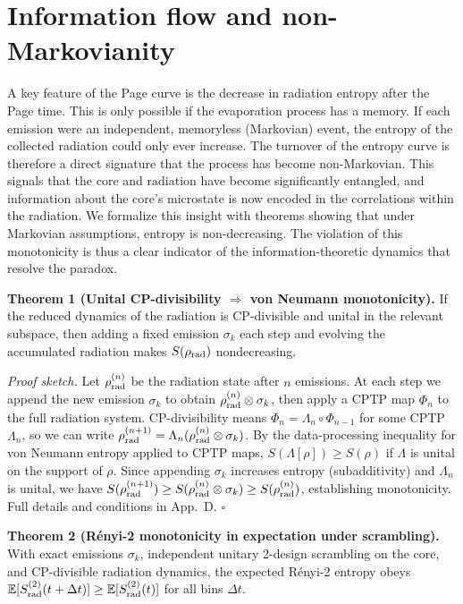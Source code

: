 \documentclass[aps,prx,onecolumn,showpacs,superscriptaddress,longbibliography,nofootinbib]{revtex4-2}
\begin{document}
\section{Information flow and non-Markovianity}
A key feature of the Page curve is the decrease in radiation entropy after the Page time. This is only possible if the evaporation process has a memory. If each emission were an independent, memoryless (Markovian) event, the entropy of the collected radiation could only ever increase. The turnover of the entropy curve is therefore a direct signature that the process has become non-Markovian. This signals that the core and radiation have become significantly entangled, and information about the core's microstate is now encoded in the correlations within the radiation. We formalize this insight with theorems showing that under Markovian assumptions, entropy is non-decreasing. The violation of this monotonicity is thus a clear indicator of the information-theoretic dynamics that resolve the paradox.

\noindent\textbf{Theorem 1 (Unital CP-divisibility $\Rightarrow$ von Neumann monotonicity).} If the reduced dynamics of the radiation is CP-divisible and unital in the relevant subspace, then adding a fixed emission $\sigma_k$ each step and evolving the accumulated radiation makes $S(\rho_{\rm rad})$ nondecreasing.

\emph{Proof sketch.} Let $\rho_{\rm rad}^{(n)}$ be the radiation state after $n$ emissions. At each step we append the new emission $\sigma_k$ to obtain $\rho_{\rm rad}^{(n)} \otimes \sigma_k$, then apply a CPTP map $\Phi_n$ to the full radiation system. CP-divisibility means $\Phi_n = \Lambda_n \circ \Phi_{n-1}$ for some CPTP $\Lambda_n$, so we can write $\rho_{\rm rad}^{(n+1)} = \Lambda_n(\rho_{\rm rad}^{(n)} \otimes \sigma_k)$. By the data-processing inequality for von Neumann entropy applied to CPTP maps, $S(\Lambda[\rho]) \ge S(\rho)$ if $\Lambda$ is unital on the support of $\rho$. Since appending $\sigma_k$ increases entropy (subadditivity) and $\Lambda_n$ is unital, we have $S(\rho_{\rm rad}^{(n+1)}) \ge S(\rho_{\rm rad}^{(n)} \otimes \sigma_k) \ge S(\rho_{\rm rad}^{(n)})$, establishing monotonicity. Full details and conditions in App.~D. \hfill$\square$

\noindent\textbf{Theorem 2 (R\'enyi-2 monotonicity in expectation under scrambling).} With exact emissions $\sigma_k$, independent unitary 2-design scrambling on the core, and CP-divisible radiation dynamics, the expected R\'enyi-2 entropy obeys $\mathbb{E}[S^{(2)}_{\rm rad}(t+\Delta t)] \ge \mathbb{E}[S^{(2)}_{\rm rad}(t)]$ for all bins $\Delta t$.
\end{document}
